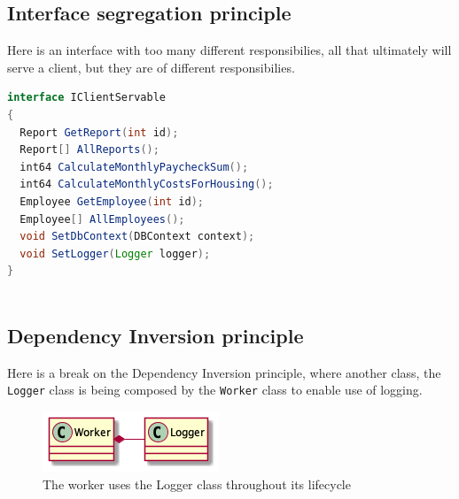 \documentclass[12pt,letterpaper]{article}
\begin{document}
\pagebreak
\subsection*{Interface segregation principle}

Here is an interface with too many different responsibilies, all that ultimately will serve a client, but they are of different responsibilies.

\begin{lstlisting}[language=Java]
interface IClientServable
{
  Report GetReport(int id);
  Report[] AllReports();
  int64 CalculateMonthlyPaycheckSum();
  int64 CalculateMonthlyCostsForHousing();
  Employee GetEmployee(int id);
  Employee[] AllEmployees();
  void SetDbContext(DBContext context);
  void SetLogger(Logger logger);
}
  
\end{lstlisting}


\subsection*{Dependency Inversion principle}

Here is a break on the Dependency Inversion principle, where another class, the \texttt{Logger} class is being composed by the \texttt{Worker} class to enable use of logging.

\begin{figure}[h]
  \centering
  \includegraphics{../out/Documents/plantuml/exercise4_dependency_inversion/exercise4_dependency_inversion.png}
  \caption{The worker uses the Logger class throughout its lifecycle}
\end{figure}
\end{document}
